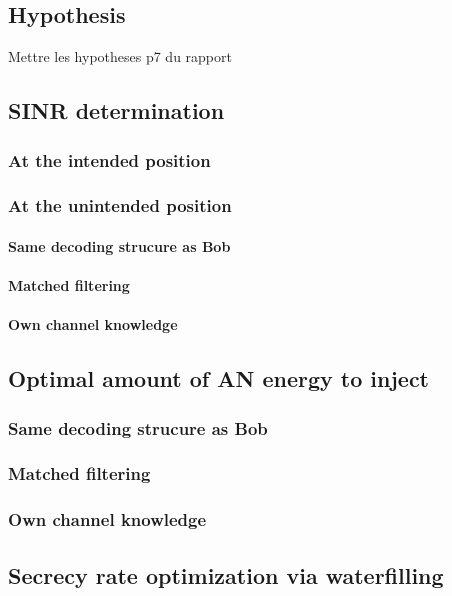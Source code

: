 \documentclass[journal,comsoc]{IEEEtran}
\begin{document}
\subsection{Hypothesis}
{\color{red} Mettre les hypotheses p7 du rapport}

\subsection{SINR determination}
\subsubsection{At the intended position}

\subsubsection{At the unintended position}
\paragraph{Same decoding strucure as Bob}
\paragraph{Matched filtering}
\paragraph{Own channel knowledge}

\subsection{Optimal amount of AN energy to inject}
\subsubsection{Same decoding strucure as Bob}
\subsubsection{Matched filtering}
\subsubsection{Own channel knowledge}

\subsection{Secrecy rate optimization via waterfilling}
\end{document}
